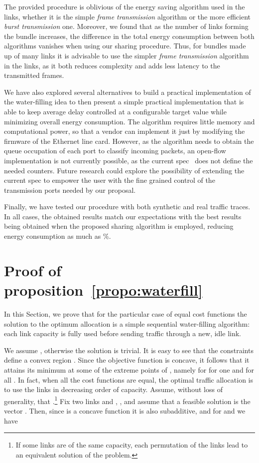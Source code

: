 \documentclass[journal,english,twocolumn,10pt,letterpaper]{IEEEtran}
\newcommand{\added}[1]{{#1}}
\begin{document}
The provided procedure is oblivious of the energy saving algorithm used in the
links, whether it is the simple \emph{frame transmission} algorithm or the
more efficient \emph{burst transmission} one. Moreover, we found that as the
number of links forming the bundle increases, the difference in the total
energy consumption between both algorithms vanishes when using our sharing
procedure. Thus, for bundles made up of many links it is advisable to use the
simpler \emph{frame transmission} algorithm in the links, as it both reduces
complexity and adds less latency to the transmitted frames.

We have also explored several alternatives to build a practical implementation
of the water-filling idea to then present a simple practical implementation
that is able to keep average delay controlled at a configurable target value
while minimizing overall energy consumption. \added{The algorithm requires
  little memory and computational power, so that a vendor can implement it
  just by modifying the firmware of the Ethernet line card. However, as the
  algorithm needs to obtain the queue occupation of each port to classify
  incoming packets, an open-flow implementation is not currently possible, as
  the current spec~\cite{foundation13:_openf_switc_specif} does not define the
  needed counters. Future research could explore the possibility of extending
  the current spec to empower the user with the fine grained control of the
  transmission ports needed by our proposal.}

Finally, we have tested our procedure with both synthetic and real
traffic traces. In all cases, the obtained results match our expectations with
the best results being obtained when the proposed sharing algorithm is
employed, reducing energy consumption as much as \%.

\appendices

\section{Proof of proposition~\ref{propo:waterfill}}
\label{sec:proof}

In this Section, we prove that for the particular case of equal cost functions
the solution to the optimum allocation is a simple sequential water-filling
algorithm: each link capacity is fully used before sending traffic through a
new, idle link. 

We assume , otherwise the solution is trivial. It is easy to
see that the constraints define a convex region . Since the
objective function is concave, it follows that it attains its minimum at some
of the extreme points of , namely  for  for one  and  for all . In fact, when all the cost functions are equal, the
optimal traffic allocation is to use the links in decreasing order of
capacity. Assume, without loss of generality, that
.\footnote{If some links are of the same capacity, each
  permutation of the links lead to an equivalent solution of the problem.} Fix
two links  and , , and assume that a feasible solution is the
vector . Then, since  is a concave
function it is also subadditive, and for  and  we have
\end{document}
